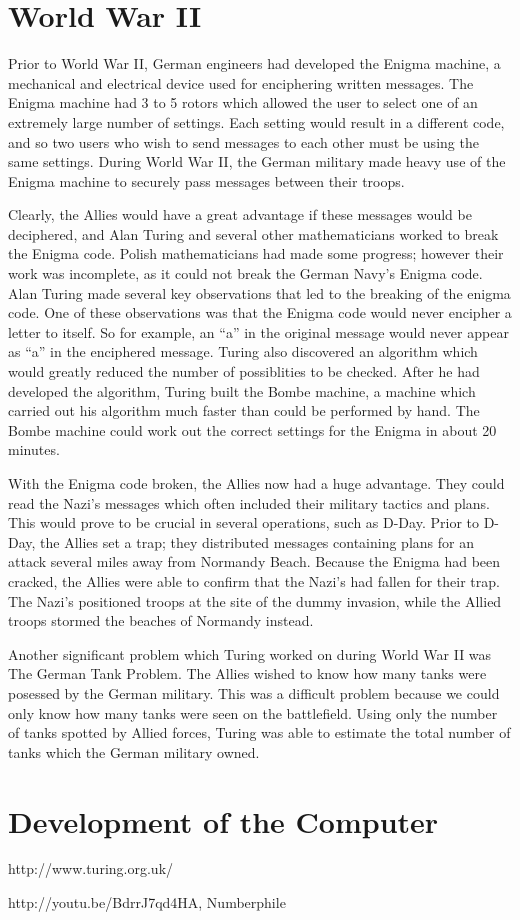 \documentclass[12pt]{article}
\theoremstyle{mystyle}
\begin{document}
\section{World War II}

Prior to World War II, German engineers had developed the Enigma machine, a
mechanical and electrical device used for enciphering written messages.
The Enigma machine had 3 to 5 rotors which allowed the user to select one of
an extremely large number of settings. Each setting would result in a different
code, and so two users who wish to send messages to each other must be
using the same settings. During World War II, the German military made heavy use
of the Enigma machine to securely pass messages between their troops.

Clearly, the Allies would have a
great advantage if these messages would be deciphered, and Alan Turing and
several other mathematicians worked to break the Enigma code. Polish
mathematicians had made some progress; however their work was incomplete, as it
could not break the German Navy's Enigma code. Alan Turing made several key
observations that led to the breaking of the enigma code. One of these
observations was that the Enigma code would never encipher a letter to itself.
So for example, an ``a'' in the original message would never appear as ``a'' in 
the enciphered message. Turing also discovered an algorithm which would greatly
reduced the number of possiblities to be checked. After he had developed the
algorithm, Turing built the Bombe machine, a machine which carried out his
algorithm much faster than could be performed by hand. The Bombe machine could
work out the correct settings for the Enigma in about 20 minutes.

With the Enigma code broken, the Allies now had a huge advantage. They could
read the Nazi's messages which often included their military tactics and plans. 
This would prove to be crucial in several operations, such as D-Day. Prior to
D-Day, the Allies set a trap; they distributed messages containing plans for an
attack several miles away from Normandy Beach. Because the Enigma had been
cracked, the Allies were able to confirm that the Nazi's had fallen for their
trap. The Nazi's positioned troops at the site of the dummy invasion, while the
Allied troops stormed the beaches of Normandy instead.

Another significant problem which Turing worked on during World War II was The
German Tank Problem. The Allies wished to know how many tanks were posessed by
the German military. This was a difficult problem because we could only know how
many tanks were seen on the battlefield. Using only the number of tanks spotted
by Allied forces, Turing was able to estimate the total number of tanks which
the German military owned.

\section{Development of the Computer}


http://www.turing.org.uk/

\begin{thebibliography}{9}

http://youtu.be/BdrrJ7qd4HA,
Numberphile

\end{thebibliography}
\end{document}
